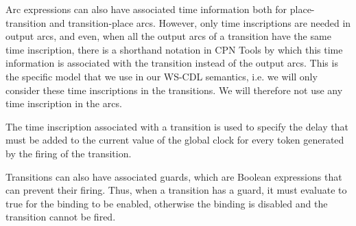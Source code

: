 Arc expressions can also have associated time information
both for place-transition and transition-place arcs.
However, only time inscriptions are needed
in output arcs, and even, when all the output arcs
of a transition have the same time inscription,
there is a shorthand notation in CPN Tools
by which this time information is associated with
the transition instead of the output arcs.
This is the specific model that we use 
in our WS-CDL semantics, i.e. we will only
consider these time inscriptions in the transitions.
We will therefore not use any time inscription
in the arcs.

The time inscription associated with a transition 
is used to specify the delay that must be added to the
current value of the global clock for
every token generated by the firing of the transition.

Transitions can also have associated guards, which
are Boolean expressions that can prevent their firing.
Thus, when a transition has a guard, it must evaluate to
true for the binding to be enabled,
otherwise the binding is disabled and 
the transition cannot be fired. 

